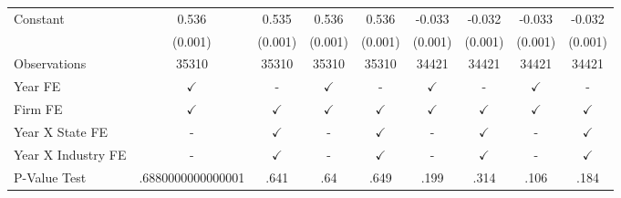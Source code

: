 {\begin{tabular}{l*{8}{c}}
Constant            &       0.536\sym{***}&       0.535\sym{***}&       0.536\sym{***}&       0.536\sym{***}&      -0.033\sym{***}&      -0.032\sym{***}&      -0.033\sym{***}&      -0.032\sym{***}\\
                    &     (0.001)         &     (0.001)         &     (0.001)         &     (0.001)         &     (0.001)         &     (0.001)         &     (0.001)         &     (0.001)         \\
\midrule
Observations        &       35310         &       35310         &       35310         &       35310         &       34421         &       34421         &       34421         &       34421         \\
Year FE             &$\checkmark$         &           -         &$\checkmark$         &           -         &$\checkmark$         &           -         &$\checkmark$         &           -         \\
Firm FE             &$\checkmark$         &$\checkmark$         &$\checkmark$         &$\checkmark$         &$\checkmark$         &$\checkmark$         &$\checkmark$         &$\checkmark$         \\
Year X State FE     &           -         &$\checkmark$         &           -         &$\checkmark$         &           -         &$\checkmark$         &           -         &$\checkmark$         \\
Year X Industry FE  &           -         &$\checkmark$         &           -         &$\checkmark$         &           -         &$\checkmark$         &           -         &$\checkmark$         \\
P-Value Test        &.6880000000000001         &        .641         &         .64         &        .649         &        .199         &        .314         &        .106         &        .184         \\
\bottomrule
\end{tabular}
}
